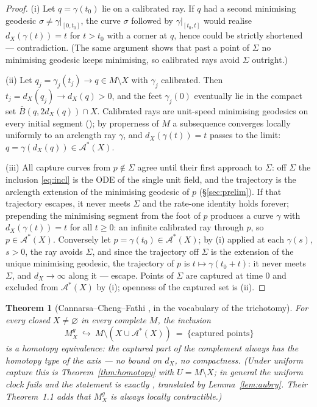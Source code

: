 \documentclass[11pt]{article}
\newtheorem{theorem}{Theorem}[section]
\theoremstyle{remark}
\newcommand{\X}{X}
\newcommand{\Mg}{M^{g}_{\X}}
\newcommand{\dX}{d_{\X}}
\newcommand{\Aub}{\mathcal{A}^{\ast}}
\begin{document}
\begin{proof}
(i) Let $q=\gamma(t_{0})$ lie on a calibrated ray. If $q$ had a
second minimising geodesic $\sigma\neq\gamma|_{[0,t_{0}]}$, the
curve $\sigma$ followed by $\gamma|_{[t_{0},t]}$ would realise
$\dX(\gamma(t))=t$ for $t>t_{0}$ with a corner at $q$, hence could
be strictly shortened --- contradiction. (The same argument shows
that past a point of $\Sigma$ no minimising geodesic keeps
minimising, so calibrated rays avoid $\Sigma$ outright.)

(ii) Let $q_{j}=\gamma_{j}(t_{j})\to q\in M\setminus\X$ with
$\gamma_{j}$ calibrated. Then $t_{j}=\dX(q_{j})\to\dX(q)>0$, and
the feet $\gamma_{j}(0)$ eventually lie in the compact set
$\bar B(q,2\dX(q))\cap\X$. Calibrated rays are unit-speed
minimising geodesics on every initial segment
(\cite[Rem.~1.5]{CCF}); by properness of $M$ a subsequence
converges locally uniformly to an arclength ray $\gamma$, and
$\dX(\gamma(t))=t$ passes to the limit: $q=\gamma(\dX(q))\in
\Aub(\X)$.

(iii) All capture curves from $p\notin\Sigma$ agree until their
first approach to $\Sigma$: off $\Sigma$ the inclusion
\eqref{eq:incl} is the ODE of the single unit field, and the
trajectory is the arclength extension of the minimising geodesic of
$p$ (\S\ref{sec:prelim}). If that trajectory escapes, it never
meets $\Sigma$ and the rate-one identity holds forever; prepending
the minimising segment from the foot of $p$ produces a curve
$\gamma$ with $\dX(\gamma(t))=t$ for all $t\ge0$: an infinite
calibrated ray through $p$, so $p\in\Aub(\X)$. Conversely let
$p=\gamma(t_{0})\in\Aub(\X)$; by (i) applied at each $\gamma(s)$,
$s>0$, the ray avoids $\Sigma$, and since the trajectory off
$\Sigma$ is the extension of the unique minimising geodesic, the
trajectory of $p$ is $t\mapsto\gamma(t_{0}+t)$: it never meets
$\Sigma$, and $\dX\to\infty$ along it --- escape. Points of
$\Sigma$ are captured at time $0$ and excluded from $\Aub(\X)$ by
(i); openness of the captured set is (ii).
\end{proof}

\begin{theorem}[{Cannarsa--Cheng--Fathi \cite[Thm.~1.6]{CCF}, in
the vocabulary of the trichotomy}]\label{thm:ccf}
For every closed $\X\neq\varnothing$ in every complete $M$, the
inclusion
\[
  \Mg\ \hookrightarrow\ M\setminus(\X\cup\Aub(\X))\ =\
  \{\text{captured points}\}
\]
is a homotopy equivalence: \emph{the captured part of the complement
always has the homotopy type of the axis} --- no bound on $\dX$, no
compactness. (Under uniform capture this is
Theorem~\ref{thm:homotopy} with $U=M\setminus\X$; in general the
uniform clock fails and the statement is exactly
\cite[Thm.~1.6]{CCF}, translated by Lemma~\ref{lem:aubry}. Their
Theorem~1.1 adds that $\Mg$ is always locally contractible.)
\end{theorem}
\end{document}
